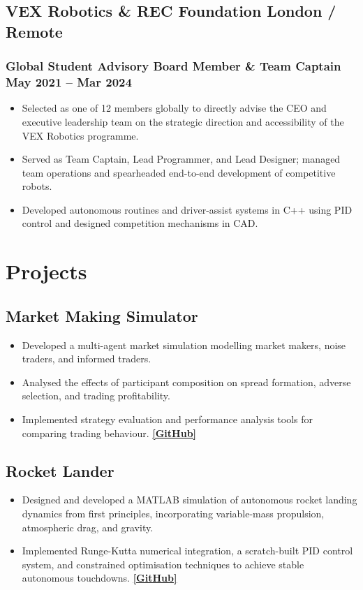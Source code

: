\documentclass[9pt]{article} %
\begin{document}
\subsection{VEX Robotics \& REC Foundation \hfill London / Remote}
\subsubsection{Global Student Advisory Board Member \& Team Captain \hfill May 2021 -- Mar 2024}
\begin{itemize}
    \item Selected as one of 12 members globally to directly advise the CEO and executive leadership team on the strategic direction and accessibility of the VEX Robotics programme.
    \item Served as Team Captain, Lead Programmer, and Lead Designer; managed team operations and spearheaded end-to-end development of competitive robots.
    \item Developed autonomous routines and driver-assist systems in C++ using PID control and designed competition mechanisms in CAD.
\end{itemize}

\section{Projects}

\subsection{Market Making Simulator}
\begin{itemize}
    \item Developed a multi-agent market simulation modelling market makers, noise traders, and informed traders.
    \item Analysed the effects of participant composition on spread formation, adverse selection, and trading profitability.
    \item Implemented strategy evaluation and performance analysis tools for comparing trading behaviour. {\small\href{https://github.com/Harik-S/oafbc-project/tree/game-implementation}{\textbf{[GitHub]}}}
\end{itemize}

\subsection{Rocket Lander}
\begin{itemize}
    \item Designed and developed a MATLAB simulation of autonomous rocket landing dynamics from first principles, incorporating variable-mass propulsion, atmospheric drag, and gravity.
    \item Implemented Runge-Kutta numerical integration, a scratch-built PID control system, and constrained optimisation techniques to achieve stable autonomous touchdowns. {\small\href{https://github.com/Harik-S/touch-down}{\textbf{[GitHub]}}}
\end{itemize}
\end{document}

